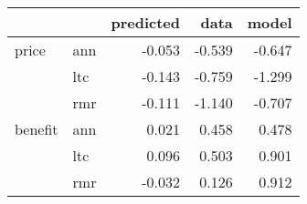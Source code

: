 \begin{tabular}{llrrr}
\toprule
        &     &  predicted &   data &  model \\
\midrule
price & ann &     -0.053 & -0.539 & -0.647 \\
        & ltc &     -0.143 & -0.759 & -1.299 \\
        & rmr &     -0.111 & -1.140 & -0.707 \\
benefit & ann &      0.021 &  0.458 &  0.478 \\
        & ltc &      0.096 &  0.503 &  0.901 \\
        & rmr &     -0.032 &  0.126 &  0.912 \\
\bottomrule
\end{tabular}
